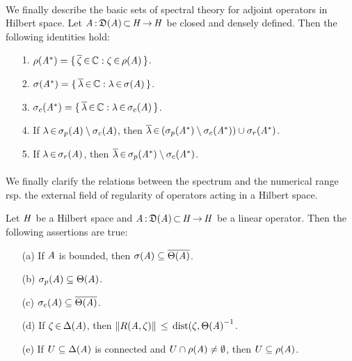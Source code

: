 \documentclass[11pt,twoside]{article}
\begin{document}
\paragraph*{}
We finally describe the basic sets of spectral theory 
for adjoint operators in Hilbert space. 
Let $\mathit{A} {\,:\,} \mathfrak{D}(\mathit{A}) {\,\subset\,} \mathit{H} {\,\to\,} \mathit{H}$
be closed and densely defined.
Then the following identities hold:

\begin{itemize}[leftmargin=12pt]
\item[1.] $\rho(\mathit{A}^*) =
          \{\, \overline{\zeta} {\,\in\,} {\mathbb{C}}: \zeta {\,\in\,} \rho(\mathit{A}) \,\}$.
\item[2.] $\sigma(\mathit{A}^*) =
          \{\, \overline{\lambda} {\,\in\,} {\mathbb{C}}: \lambda {\,\in\,} \sigma(\mathit{A}) \,\}$.
\item[3.] $\sigma_c(\mathit{A}^*) =
          \{\, \overline{\lambda} {\,\in\,} {\mathbb{C}}: \lambda {\,\in\,} \sigma_c(\mathit{A}) \,\}$.
\item[4.] If $\lambda {\,\in\,} \sigma_p(\mathit{A}) \setminus \sigma_c(\mathit{A})$,
          then $\overline{\lambda} {\,\in\,} (\sigma_p(\mathit{A}^*) \setminus
               \sigma_c(\mathit{A}^*)) \cup \sigma_r(\mathit{A}^*)$.
\item[5.] If $\lambda {\,\in\,} \sigma_r(\mathit{A})$,
          then $\overline{\lambda} {\,\in\,} \sigma_p(\mathit{A}^*) \setminus
                                       \sigma_c(\mathit{A}^*)$.
\end{itemize}

\paragraph*{} %
We finally clarify the relations
between the spectrum and the numerical range
rsp. the external field of regularity
of operators acting in a Hilbert space.

\begin{theorem}
Let $\mathit{H}$ be a Hilbert space and
$\mathit{A} {\,:\,} \mathfrak{D}(\mathit{A}) {\,\subset\,} \mathit{H} {\,\to\,} \mathit{H}$ be a linear operator.
Then the following assertions are true:

\begin{itemize}[leftmargin=15pt,itemsep=2pt]
\item[(a)]
If $\mathit{A}$ is bounded,
then $\sigma(\mathit{A}) \subseteq \overline{\Theta(\mathit{A})}$.

\item[(b)]
$\sigma_p(\mathit{A}) \subseteq \Theta(\mathit{A})$.

\item[(c)]
$\sigma_c(\mathit{A}) \subseteq \overline{\Theta(\mathit{A})}$.

\item[(d)]
If $\zeta {\,\in\,} \Delta(\mathit{A})$,
then
$\left\lVert R(\mathit{A},\zeta) \right\rVert \, \leq \, {\mbox{dist}(\zeta,\Theta(\mathit{A})}^{-1}$.

\item[(e)]
If $U \subseteq \Delta(\mathit{A})$ is connected
and $U \cap \rho(\mathit{A}) \neq \emptyset$,
then $U \subseteq \rho(\mathit{A})$.
\end{itemize}
\end{theorem}
\end{document}
